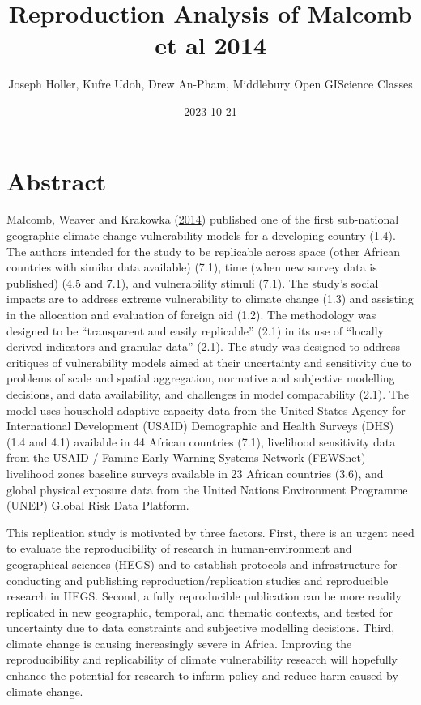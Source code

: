 \documentclass[
]{article}
\title{Reproduction Analysis of Malcomb et al 2014}
\author{Joseph Holler, Kufre Udoh, Drew An-Pham, Middlebury Open
GIScience Classes}
\date{2023-10-21}
\begin{document}
\maketitle

\hypertarget{abstract}{%
\section{Abstract}\label{abstract}}

Malcomb, Weaver and Krakowka
(\href{https://doi.org/10.1016/j.apgeog.2014.01.004}{2014}) published
one of the first sub-national geographic climate change vulnerability
models for a developing country (1.4). The authors intended for the
study to be replicable across space (other African countries with
similar data available) (7.1), time (when new survey data is published)
(4.5 and 7.1), and vulnerability stimuli (7.1). The study's social
impacts are to address extreme vulnerability to climate change (1.3) and
assisting in the allocation and evaluation of foreign aid (1.2). The
methodology was designed to be ``transparent and easily replicable''
(2.1) in its use of ``locally derived indicators and granular data''
(2.1). The study was designed to address critiques of vulnerability
models aimed at their uncertainty and sensitivity due to problems of
scale and spatial aggregation, normative and subjective modelling
decisions, and data availability, and challenges in model comparability
(2.1). The model uses household adaptive capacity data from the United
States Agency for International Development (USAID) Demographic and
Health Surveys (DHS) (1.4 and 4.1) available in 44 African countries
(7.1), livelihood sensitivity data from the USAID / Famine Early Warning
Systems Network (FEWSnet) livelihood zones baseline surveys available in
23 African countries (3.6), and global physical exposure data from the
United Nations Environment Programme (UNEP) Global Risk Data Platform.

This replication study is motivated by three factors. First, there is an
urgent need to evaluate the reproducibility of research in
human-environment and geographical sciences (HEGS) and to establish
protocols and infrastructure for conducting and publishing
reproduction/replication studies and reproducible research in HEGS.
Second, a fully reproducible publication can be more readily replicated
in new geographic, temporal, and thematic contexts, and tested for
uncertainty due to data constraints and subjective modelling decisions.
Third, climate change is causing increasingly severe in Africa.
Improving the reproducibility and replicability of climate vulnerability
research will hopefully enhance the potential for research to inform
policy and reduce harm caused by climate change.
\end{document}

